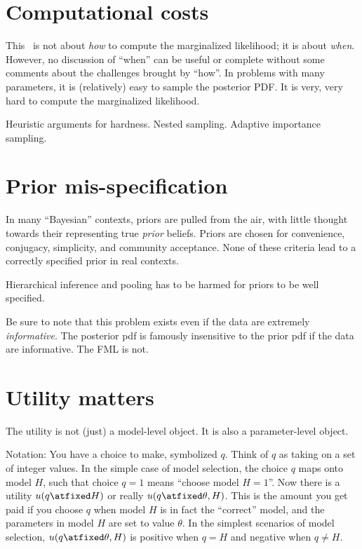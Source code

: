 \documentclass[12pt,twoside]{article}
\begin{document}
\section{Computational costs}

This \documentname\ is not about \emph{how} to compute the marginalized likelihood;
  it is about \emph{when}.
However, no discussion of ``when'' can be useful or complete without some comments
  about the challenges brought by ``how''.
In problems with many parameters, it is (relatively) easy to sample the posterior PDF.
It is very, very hard to compute the marginalized likelihood.

Heuristic arguments for hardness.
Nested sampling.
Adaptive importance sampling.

\section{Prior mis-specification}

In many ``Bayesian'' contexts, priors are pulled from the air,
  with little thought towards their representing true \emph{prior} beliefs.
Priors are chosen for convenience, conjugacy, simplicity, and community acceptance.
None of these criteria lead to a correctly specified prior in real contexts.

Hierarchical inference and pooling has to be harmed for priors to be well specified.

Be sure to note that this problem exists even if the data are extremely \emph{informative}.
The posterior pdf is famously insensitive to the prior pdf if the data are informative.
The FML is not.

\section{Utility matters}

The utility is not (just) a model-level object.
It is also a parameter-level object.

Notation: You have a choice to make, symbolized $q$.
Think of $q$ as taking on a set of integer values.
In the simple case of model selection,
  the choice $q$ maps onto model $H$,
  such that choice $q=1$ means ``choose model $H=1$''.
Now there is a utility $u(q\atfixed H)$ or really $u(q\atfixed\theta,H)$.
This is the amount you get paid if you choose $q$ when model $H$ is in fact the ``correct'' model,
  and the parameters in model $H$ are set to value $\theta$.
In the simplest scenarios of model selection,
  $u(q\atfixed\theta,H)$ is positive when $q=H$ and negative when $q\neq H$.
\end{document}
